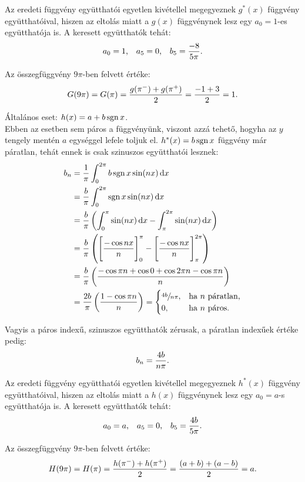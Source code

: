 \begin{exercise}
{    Az eredeti függvény együtthatói egyetlen kivétellel megegyeznek $g^*(x)$
    függvény együtthatóival, hiszen az eltolás miatt a $g(x)$ függvénynek
    lesz egy $a_0 = 1$-es együtthatója is. A keresett együtthatók tehát:
    \[
      a_0 = 1
      \text,
      \quad
      a_5 = 0
      \text,
      \quad
      b_5 = \frac{-8}{5 \pi}
      \text.
    \]

    Az összegfüggvény $9\pi$-ben felvett értéke:
    \[
      G(9 \pi) = G(\pi) = \frac{g(\pi^-) + g(\pi^+)}{2} = \frac{-1+3}{2} = 1
      \text.
    \]

    \tcbline

    Általános eset: $h(x) = a + b \operatorname{sgn} x$. \\[3mm]
    Ebben az esetben sem páros a függvényünk, viszont azzá tehető, hogyha
    az $y$ tengely mentén $a$ egységgel lefele toljuk el. $h^*(x) = b \operatorname{sgn} x$
    függvény már páratlan, tehát ennek is csak szinuszos együtthatói lesznek:
    \begin{align*}
      b_n
       & = \frac{1}{\pi} \int_0^{2\pi} b \sgn x \sin(n x) \, \mathrm d x
      \\
       & = \frac{b}{\pi} \int_0^{2\pi} \sgn x \sin(n x) \, \mathrm d x
      \\
       & = \frac{b}{\pi} \left(
      \int_0^{\pi} \sin(n x) \, \mathrm d x -
      \int_\pi^{2\pi} \sin(n x) \, \mathrm d x
      \right)
      \\
       & = \frac{b}{\pi} \left(
      \Bigg[ \frac{-\cos n x}{n} \Bigg]_{0}^{\pi} -
      \Bigg[ \frac{-\cos n x}{n} \Bigg]_{\pi}^{2\pi}
      \right)
      \\
       & = \frac{b}{\pi} \left(
      \frac{%
        - \cos \pi n
        + \cos 0
        + \cos 2 \pi n
        - \cos \pi n
      }{n}
      \right)
      \\
       & = \frac{2b}{\pi} \left(
      \frac{1 - \cos \pi n}{n}
      \right)
      = \begin{cases}
          \sfrac{4b}{n \pi}, & \text{ha } n \text{ páratlan,} \\
          0,                 & \text{ha } n \text{ páros.}
        \end{cases}
    \end{align*}

    Vagyis a páros indexű, szinuszos együtthatók zérusak, a páratlan indexűek
    értéke pedig:
    \[
      b_n = \frac{4b}{n\pi}
      \text.
    \]

    Az eredeti függvény együtthatói egyetlen kivétellel megegyeznek $h^*(x)$
    függvény együtthatóival, hiszen az eltolás miatt a $h(x)$ függvénynek
    lesz egy $a_0 = a$-s együtthatója is. A keresett együtthatók tehát:
    \[
      a_0 = a
      \text,
      \quad
      a_5 = 0
      \text,
      \quad
      b_5 = \frac{4b}{5 \pi}
      \text.
    \]

    Az összegfüggvény $9\pi$-ben felvett értéke:
    \[
      H(9 \pi) = H(\pi) = \frac{h(\pi^-) + h(\pi^+)}{2} = \frac{(a+b)+(a-b)}{2} = a
      \text.
    \]
  }
\end{exercise}

